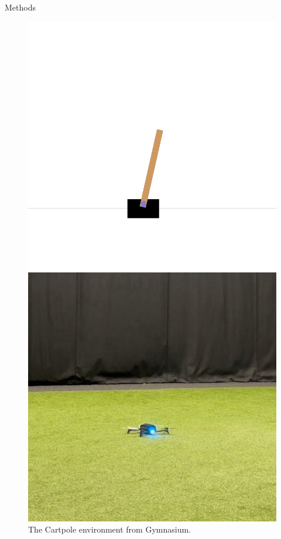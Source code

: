 \documentclass[final,35pt]{beamer}
\newlength{\colwidth}
\begin{document}
\begin{frame}
\begin{columns}[t]
\begin{column}{\colwidth}
\begin{block}{{\fontsize{48}{40}\selectfont Methods}}
\end{block}

\vspace{1.5cm}

\begin{figure}[h!]
    \centering
    \begin{minipage}{0.45\textwidth}
        \centering
        \includegraphics[width=\textwidth]{figures/cartpole.png}
        \caption{{\fontsize{28}{40}\selectfont The Cartpole environment from Gymnasium.}}
        \label{fig:image1}
    \end{minipage}\hfill
    \begin{minipage}{0.45\textwidth}
        \centering
        \includegraphics[width=\textwidth]{figures/bebop2.JPG}

\end{minipage}
\end{figure}
\end{column}
\end{columns}
\end{frame}
\end{document}
